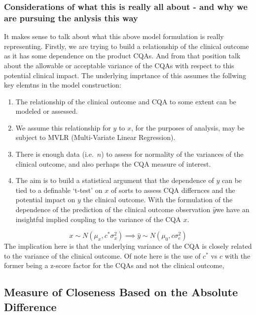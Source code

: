 \documentclass[
  12pt,
  a4paper,
]{article}
\providecommand{\tightlist}{%
  \setlength{\itemsep}{0pt}\setlength{\parskip}{0pt}}
\numberwithin{equation}{section}
\theoremstyle{plain}
\theoremstyle{definition}
\theoremstyle{remark}
\theoremstyle{note}
\begin{document}
\hypertarget{considerations-of-what-this-is-really-all-about---and-why-we-are-pursuing-the-anlysis-this-way}{%
\subsubsection{Considerations of what this is really all about - and why
we are pursuing the anlysis this
way}\label{considerations-of-what-this-is-really-all-about---and-why-we-are-pursuing-the-anlysis-this-way}}

It makes sense to talk about what this above model formulation is really
representing. Firstly, we are trying to build a relationship of the
clinical outcome as it has some dependence on the product CQAs. And from
that position talk about the allowable or acceptable variance of the
CQAs with respect to this potential clinical impact. The underlying
imprtance of this assumes the follwing key elemtns in the model
construction:

\begin{enumerate}
\def\labelenumi{\arabic{enumi}.}
\tightlist
\item
  The relationship of the clinical outcome and CQA to some extent can be
  modeled or assessed.
\item
  We assume this relationship for \(y\) to \(x\), for the purposes of
  analysis, may be subject to MVLR (Multi-Variate Linear Regression).
\item
  There is enough data (i.e.~\(n\)) to assess for normality of the
  variances of the clinical outcome, and also perhaps the CQA measure of
  interest.
\item
  The aim is to build a statistical argument that the dependence of
  \(y\) can be tied to a definable `t-test' on \(x\) of sorts to assess
  CQA differnces and the potential impact on \(y\) the clinical outcome.
  With the formulation of the dependence of the prediction of the
  clinical outcome observation \(\hat{y}\)we have an insightful implied
  coupling to the variance of the CQA \(x\).
\end{enumerate}

\[
  x \sim N\left(\mu_{x}, c^* \sigma_x^2\right)\implies \hat{y} \sim N\left(\mu_0, c \sigma_e^2\right)
\] The implication here is that the underlying variance of the CQA is
closely related to the variance of the clinical outcome. Of note here is
the use of \(c^*\) vs \(c\) with the former being a z-score factor for
the CQAs and not the clinical outcome,

\hypertarget{measure-of-closeness-based-on-the-absolute-difference}{%
\subsection{Measure of Closeness Based on the Absolute
Difference}\label{measure-of-closeness-based-on-the-absolute-difference}}
\end{document}
